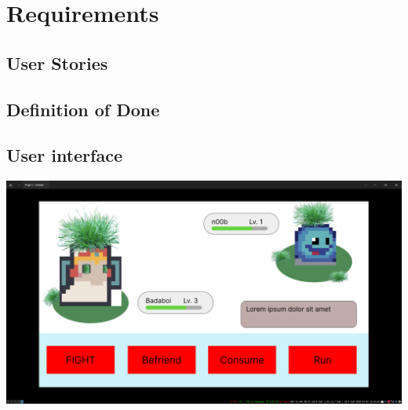 \section{Requirements}

\subsection{User Stories}

\subsection{Definition of Done}

\subsection{User interface}

\includegraphics[width=17cm]{images/5_006.png}